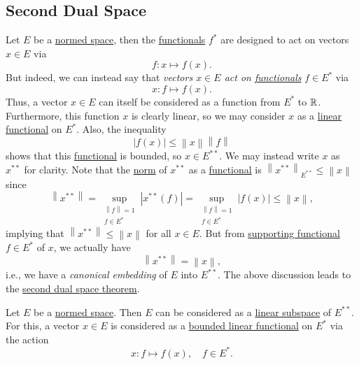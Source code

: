 \subsection{Second Dual Space}
Let \(E\) be a \hyperref[def:normed-vector-space]{normed space}, then the \hyperref[def:linear-functional]{functionals} \(f^{\ast} \) are designed to act on vectors \(x\in E\) via
\[
	f\colon x \mapsto f(x).
\]
But indeed, we can instead say that \emph{vectors \(x\in E\) act on \hyperref[def:linear-functional]{functionals}} \(f\in E^{\ast} \) via
\[
	x\colon f\mapsto f(x).
\]
Thus, a vector \(x\in E\) can itself be considered as a function from \(E^{\ast} \) to \(\mathbb{\MakeUppercase{r}} \). Furthermore, this function \(x\) is clearly linear, so we may consider \(x\) as a \hyperref[def:linear-functional]{linear functional} on \(E^{\ast} \). Also, the inequality
\[
	\left\vert f(x) \right\vert \leq \left\lVert x\right\rVert \left\lVert f\right\rVert
\]
shows that this \hyperref[def:linear-functional]{functional} is bounded, so \(x\in E^{\ast\ast} \). We may instead write \(x\) as \(x^{\ast\ast} \) for clarity. Note that the \hyperref[def:norm]{norm} of \(x^{\ast\ast} \) as a \hyperref[def:linear-functional]{functional} is \(\left\lVert x^{\ast\ast} \right\rVert _{E^{\ast\ast} } \leq \left\lVert x\right\rVert \) since
\[
	\left\lVert x^{\ast\ast} \right\rVert = \sup _{\substack{\left\lVert f\right\rVert = 1\\ f\in E^{\ast} }}\left\vert x^{\ast\ast} (f) \right\vert = \sup _{\substack{\left\lVert f\right\rVert = 1\\ f\in E^{\ast}}} \left\vert f(x) \right\vert  \leq \left\lVert x\right\rVert,
\]
implying that \(\left\lVert x^{\ast\ast} \right\rVert \leq \left\lVert x\right\rVert \) for all \(x\in E\). But from \hyperref[thm:supporting-functional]{supporting functional} \(f\in E^{\ast} \) of \(x\), we actually have
\[
	\left\lVert x^{\ast\ast} \right\rVert = \left\lVert x\right\rVert,
\]
i.e., we have a \emph{canonical embedding} of \(E\) into \(E^{\ast\ast}\). The above discussion leads to the \hyperref[thm:second-dual-space]{second dual space theorem}.

\begin{theorem}\label{thm:second-dual-space}
	Let \(E\) be a \hyperref[def:normed-vector-space]{normed space}. Then \(E\) can be considered as a \hyperref[def:linear-vector-space]{linear subspace} of \(E^{\ast\ast}\). For this, a vector \(x\in E\) is considered as a \hyperref[def:bounded-linear-functional]{bounded linear functional} on \(E^{\ast} \) via the action
	\[
		x\colon f\mapsto f(x),\quad f\in E^{\ast}.
	\]
\end{theorem}


